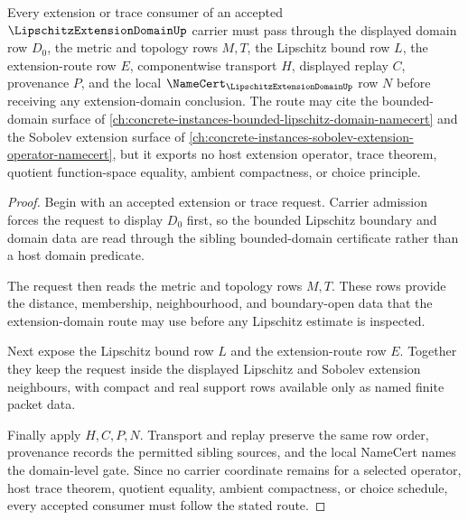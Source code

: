 \begin{theorem}
\label{thm:lipschitz-extension-domain-extension-trace-route}
Every extension or trace consumer of an accepted $\LipschitzExtensionDomainUp$ carrier must pass through the displayed domain row $D_0$, the metric and topology rows $M,T$, the Lipschitz bound row $L$, the extension-route row $E$, componentwise transport $H$, displayed replay $C$, provenance $P$, and the local $\NameCert_{\LipschitzExtensionDomainUp}$ row $N$ before receiving any extension-domain conclusion. The route may cite the bounded-domain surface of \autoref{ch:concrete-instances-bounded-lipschitz-domain-namecert} and the Sobolev extension surface of \autoref{ch:concrete-instances-sobolev-extension-operator-namecert}, but it exports no host extension operator, trace theorem, quotient function-space equality, ambient compactness, or choice principle.
\end{theorem}
\begin{proof}
Begin with an accepted extension or trace request. Carrier admission forces the request to display $D_0$ first, so the bounded Lipschitz boundary and domain data are read through the sibling bounded-domain certificate rather than a host domain predicate.

The request then reads the metric and topology rows $M,T$. These rows provide the distance, membership, neighbourhood, and boundary-open data that the extension-domain route may use before any Lipschitz estimate is inspected.

Next expose the Lipschitz bound row $L$ and the extension-route row $E$. Together they keep the request inside the displayed Lipschitz and Sobolev extension neighbours, with compact and real support rows available only as named finite packet data.

Finally apply $H,C,P,N$. Transport and replay preserve the same row order, provenance records the permitted sibling sources, and the local NameCert names the domain-level gate. Since no carrier coordinate remains for a selected operator, host trace theorem, quotient equality, ambient compactness, or choice schedule, every accepted consumer must follow the stated route.
\end{proof}


